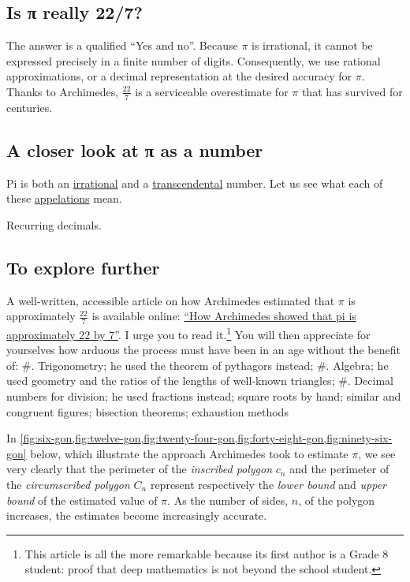 \documentclass[
  a4paper,
]{article}
\begin{document}
\subsection{Is π really 22/7?}\label{is-ux3c0-really-227}

The answer is a qualified ``Yes and no''. Because \(\pi\) is irrational,
it cannot be expressed precisely in a finite number of digits.
Consequently, we use rational approximations, or a decimal
representation at the desired accuracy for \(\pi\). Thanks to
Archimedes, \(\frac{22}{7}\) is a serviceable overestimate for \(\pi\)
that has survived for centuries.

\subsection{A closer look at π as a
number}\label{a-closer-look-at-ux3c0-as-a-number}

Pi is both an
\href{https://en.wikipedia.org/wiki/Irrational_number}{irrational} and a
\href{https://en.wikipedia.org/wiki/Transcendental_number}{transcendental}
number. Let us see what each of these
\href{https://www.merriam-webster.com/dictionary/appellation}{appelations}
mean.

Recurring decimals.

\subsection{To explore further}\label{to-explore-further}

A well-written, accessible article on how Archimedes estimated that
\(\pi\) is approximately \(\frac{22}{7}\) is available online:
\href{https://publications.azimpremjiuniversity.edu.in/3356/1/02-DaminiAndAbhishek_PiIs22By7_Final.pdf}{``How
Archimedes showed that pi is approximately 22 by 7''}. I urge you to
read it.\footnote{This article is all the more remarkable because its
  first author is a Grade 8 student: proof that deep mathematics is not
  beyond the school student.} You will then appreciate for yourselves
how arduous the process must have been in an age without the benefit of:
\#. Trigonometry; he used the theorem of pythagors instead; \#. Algebra;
he used geometry and the ratios of the lengths of well-known triangles;
\#. Decimal numbers for division; he used fractions instead; square
roots by hand; similar and congruent figures; bisection theorems;
exhaustion methods

In
\cref{fig:six-gon,fig:twelve-gon,fig:twenty-four-gon,fig:forty-eight-gon,fig:ninety-six-gon}
below, which illustrate the approach Archimedes took to estimate
\(\pi\), we see very clearly that the perimeter of the \emph{inscribed
polygon} \(c_n\) and the perimeter of the \emph{circumscribed polygon}
\(C_n\) represent respectively the \emph{lower bound} and \emph{upper
bound} of the estimated value of \(\pi\). As the number of sides, \(n\),
of the polygon increases, the estimates become increasingly accurate.
\end{document}
